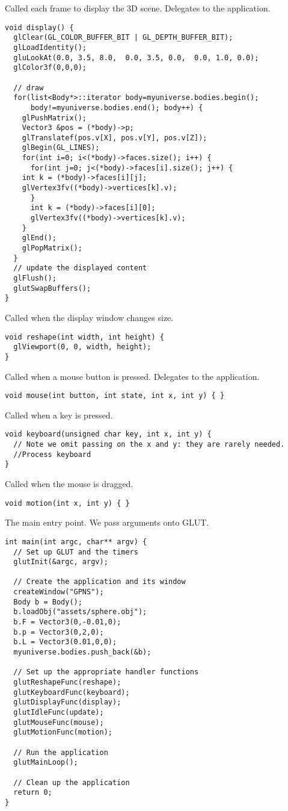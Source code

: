 Called each frame to display the 3D scene. Delegates to
the application.
\begin{lstlisting}
void display() {
  glClear(GL_COLOR_BUFFER_BIT | GL_DEPTH_BUFFER_BIT);
  glLoadIdentity();
  gluLookAt(0.0, 3.5, 8.0,  0.0, 3.5, 0.0,  0.0, 1.0, 0.0);
  glColor3f(0,0,0);
  
  // draw
  for(list<Body*>::iterator body=myuniverse.bodies.begin();
      body!=myuniverse.bodies.end(); body++) {
    glPushMatrix();
    Vector3 &pos = (*body)->p;
    glTranslatef(pos.v[X], pos.v[Y], pos.v[Z]);
    glBegin(GL_LINES);
    for(int i=0; i<(*body)->faces.size(); i++) {      
      for(int j=0; j<(*body)->faces[i].size(); j++) {
	int k = (*body)->faces[i][j]; 
	glVertex3fv((*body)->vertices[k].v);
      }
      int k = (*body)->faces[i][0]; 
      glVertex3fv((*body)->vertices[k].v);
    }
    glEnd();
    glPopMatrix();
  }
  // update the displayed content
  glFlush();
  glutSwapBuffers();
}
\end{lstlisting}

Called when the display window changes size.
\begin{lstlisting}
void reshape(int width, int height) {
  glViewport(0, 0, width, height);
}
\end{lstlisting}

Called when a mouse button is pressed. Delegates to the
application.
\begin{lstlisting}
void mouse(int button, int state, int x, int y) { }
\end{lstlisting}

Called when a key is pressed.
\begin{lstlisting}
void keyboard(unsigned char key, int x, int y) {
  // Note we omit passing on the x and y: they are rarely needed.
  //Process keyboard
}
\end{lstlisting}

Called when the mouse is dragged.
\begin{lstlisting}
void motion(int x, int y) { }
\end{lstlisting}

The main entry point. We pass arguments onto GLUT.
\begin{lstlisting}
int main(int argc, char** argv) {
  // Set up GLUT and the timers
  glutInit(&argc, argv);
  
  // Create the application and its window
  createWindow("GPNS");
  Body b = Body();
  b.loadObj("assets/sphere.obj");
  b.F = Vector3(0,-0.01,0);
  b.p = Vector3(0,2,0);
  b.L = Vector3(0.01,0,0);
  myuniverse.bodies.push_back(&b);
  
  // Set up the appropriate handler functions
  glutReshapeFunc(reshape);
  glutKeyboardFunc(keyboard);
  glutDisplayFunc(display);
  glutIdleFunc(update);
  glutMouseFunc(mouse);
  glutMotionFunc(motion);
  
  // Run the application
  glutMainLoop();
  
  // Clean up the application
  return 0;
}
\end{lstlisting}
